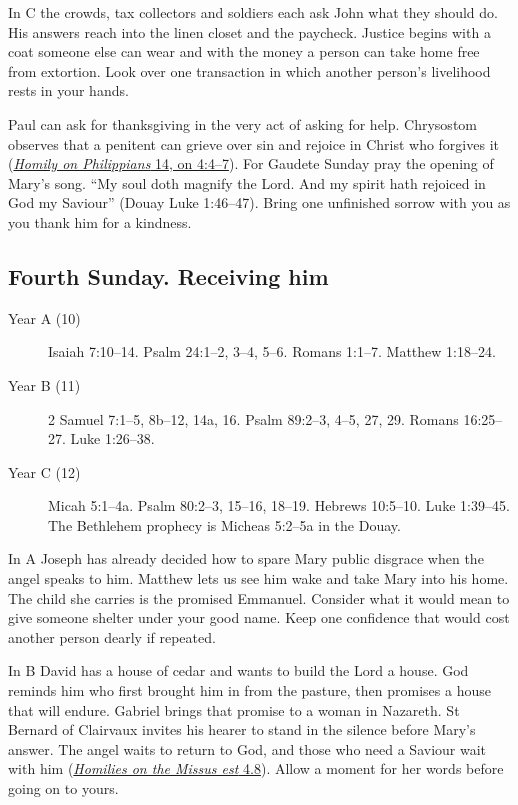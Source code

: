 In C the crowds, tax collectors and soldiers each ask John what they
should do. His answers reach into the linen closet and the paycheck. Justice begins with a coat someone else can wear and with the
money a person can take home free from extortion. Look over one
transaction in which another person's livelihood rests in your hands.

Paul can ask for thanksgiving in the very act of asking for help.
Chrysostom observes that a penitent can grieve over sin and rejoice in
Christ who forgives it (\href{https://www.newadvent.org/fathers/230214.htm}{\emph{Homily on Philippians} 14, on 4:4--7}).
For Gaudete Sunday pray the opening of Mary's song. “My soul doth
magnify the Lord. And my spirit hath rejoiced in God my Saviour”
(Douay Luke 1:46--47). Bring one unfinished sorrow with you as you
thank him for a kindness.

\subsection{Fourth Sunday. Receiving him}

\begin{description}
\item[Year A (10)] Isaiah 7:10--14. Psalm 24:1--2, 3--4, 5--6.
Romans 1:1--7. Matthew 1:18--24.
\item[Year B (11)] 2 Samuel 7:1--5, 8b--12, 14a, 16.
Psalm 89:2--3, 4--5, 27, 29. Romans 16:25--27. Luke 1:26--38.
\item[Year C (12)] Micah 5:1--4a. Psalm 80:2--3, 15--16, 18--19.
Hebrews 10:5--10. Luke 1:39--45. The Bethlehem prophecy is Micheas
5:2--5a in the Douay.
\end{description}

In A Joseph has already decided how to spare Mary public disgrace when
the angel speaks to him. Matthew lets us see him wake and take Mary
into his home. The child she carries is the promised Emmanuel.
Consider what it would mean to give someone shelter under your good
name. Keep one confidence that would cost another person dearly if
repeated.

In B David has a house of cedar and wants to build the Lord a house.
God reminds him who first brought him in from the pasture, then
promises a house that will endure. Gabriel brings that promise to a
woman in Nazareth. St Bernard of Clairvaux invites his hearer to stand
in the silence before Mary's answer. The angel waits to return to God,
and those who need a Saviour wait with him
(\href{https://archive.org/details/sermonsofstberna00bernuoft/page/68/mode/1up}{\emph{Homilies on the Missus est} 4.8}).
Allow a moment for her words before going on to yours.

